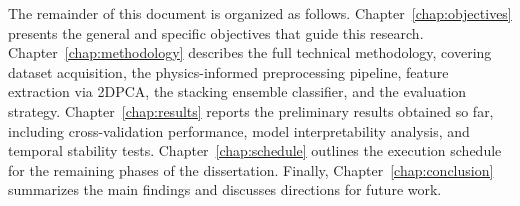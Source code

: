 The remainder of this document is organized as follows. Chapter~\ref{chap:objectives} presents the general and specific objectives that guide this research. Chapter~\ref{chap:methodology} describes the full technical methodology, covering dataset acquisition, the physics-informed preprocessing pipeline, feature extraction via 2DPCA, the stacking ensemble classifier, and the evaluation strategy. Chapter~\ref{chap:results} reports the preliminary results obtained so far, including cross-validation performance, model interpretability analysis, and temporal stability tests. Chapter~\ref{chap:schedule} outlines the execution schedule for the remaining phases of the dissertation. Finally, Chapter~\ref{chap:conclusion} summarizes the main findings and discusses directions for future work.
